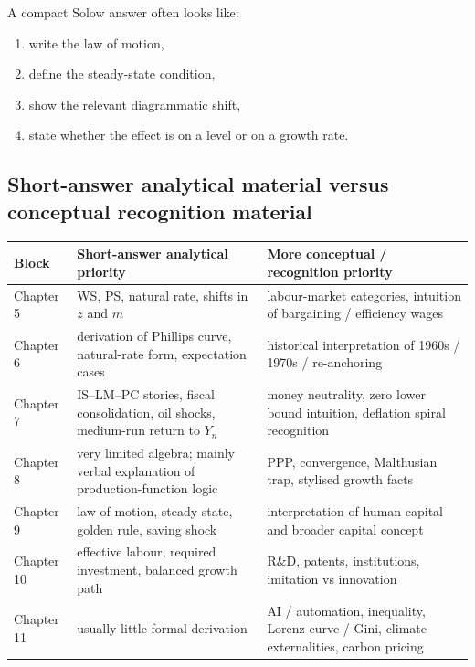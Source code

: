 \documentclass[12pt]{article}
\begin{document}
\begin{examtip}[title={Exam Focus: Standard Solow script}]
A compact Solow answer often looks like:
\begin{enumerate}[leftmargin=1.5em]
    \item write the law of motion,
    \item define the steady-state condition,
    \item show the relevant diagrammatic shift,
    \item state whether the effect is on a level or on a growth rate.
\end{enumerate}
\end{examtip}

\subsection{Short-answer analytical material versus conceptual recognition material}

\begin{center}
\renewcommand{\arraystretch}{1.25}
\begin{tabularx}{\textwidth}{|p{2.2cm}|X|X|}
\hline
\textbf{Block} & \textbf{Short-answer analytical priority} & \textbf{More conceptual / recognition priority} \\
\hline
Chapter 5 & WS, PS, natural rate, shifts in $z$ and $m$ & labour-market categories, intuition of bargaining / efficiency wages \\
\hline
Chapter 6 & derivation of Phillips curve, natural-rate form, expectation cases & historical interpretation of 1960s / 1970s / re-anchoring \\
\hline
Chapter 7 & IS--LM--PC stories, fiscal consolidation, oil shocks, medium-run return to $Y_n$ & money neutrality, zero lower bound intuition, deflation spiral recognition \\
\hline
Chapter 8 & very limited algebra; mainly verbal explanation of production-function logic & PPP, convergence, Malthusian trap, stylised growth facts \\
\hline
Chapter 9 & law of motion, steady state, golden rule, saving shock & interpretation of human capital and broader capital concept \\
\hline
Chapter 10 & effective labour, required investment, balanced growth path & R\&D, patents, institutions, imitation vs innovation \\
\hline
Chapter 11 & usually little formal derivation & AI / automation, inequality, Lorenz curve / Gini, climate externalities, carbon pricing \\
\hline
\end{tabularx}
\end{center}
\end{document}
